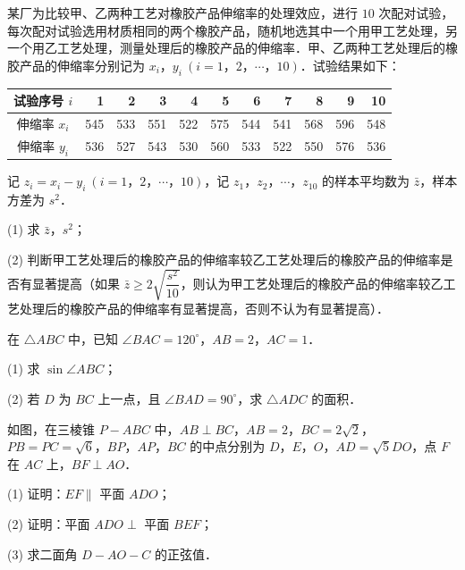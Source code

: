\begin{question}
某厂为比较甲、乙两种工艺对橡胶产品伸缩率的处理效应，进行 $10$ 次配对试验，每次配对试验选用材质相同的两个橡胶产品，随机地选其中一个用甲工艺处理，另一个用乙工艺处理，测量处理后的橡胶产品的伸缩率．甲、乙两种工艺处理后的橡胶产品的伸缩率分别记为 $x_i\text{，}y_i\ (i=1\text{，}2\text{，}\cdots\text{，}10)$．试验结果如下：

\begin{center}
\begingroup\setlength{\tabcolsep}{4pt}
\begin{tabular}{crrrrrrrrrr}
\toprule
试验序号 $i$ & 1 & 2 & 3 & 4 & 5 & 6 & 7 & 8 & 9 & 10 \\
\midrule
伸缩率 $x_i$ & 545 & 533 & 551 & 522 & 575 & 544 & 541 & 568 & 596 & 548 \\
伸缩率 $y_i$ & 536 & 527 & 543 & 530 & 560 & 533 & 522 & 550 & 576 & 536 \\
\bottomrule
\end{tabular}
\endgroup
\end{center}

记 $z_i=x_i-y_i\ (i=1\text{，}2\text{，}\cdots\text{，}10)$，记 $z_1\text{，}z_2\text{，}\cdots\text{，}z_{10}$ 的样本平均数为 $\bar z$，样本方差为 $s^2$．

(1) 求 $\bar z\text{，}s^2$；

(2) 判断甲工艺处理后的橡胶产品的伸缩率较乙工艺处理后的橡胶产品的伸缩率是否有显著提高（如果 $\bar z\geqslant2\sqrt{\dfrac{s^2}{10}}$，则认为甲工艺处理后的橡胶产品的伸缩率较乙工艺处理后的橡胶产品的伸缩率有显著提高，否则不认为有显著提高）．

\end{question}
\begin{question}
在 $\triangle ABC$ 中，已知 $\angle BAC=120^\circ$，$AB=2$，$AC=1$．

(1) 求 $\sin\angle ABC$；

(2) 若 $D$ 为 $BC$ 上一点，且 $\angle BAD=90^\circ$，求 $\triangle ADC$ 的面积．

\Needspace{0.4\textheight}
\end{question}
\begin{question}
如图，在三棱锥 $P-ABC$ 中，$AB\perp BC$，$AB=2$，$BC=2\sqrt2$，$PB=PC=\sqrt6$，$BP\text{，}AP\text{，}BC$ 的中点分别为 $D\text{，}E\text{，}O$，$AD=\sqrt5DO$，点 $F$ 在 $AC$ 上，$BF\perp AO$．
\nopagebreak[4]
\begin{center}\end{center}
\nopagebreak[4]
(1) 证明：$EF\parallel$ 平面 $ADO$；

(2) 证明：平面 $ADO\perp$ 平面 $BEF$；

(3) 求二面角 $D-AO-C$ 的正弦值．

\end{question}

